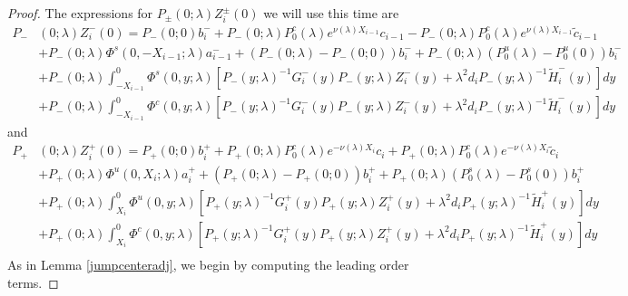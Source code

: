 \documentclass[thesis.tex]{subfiles}
\begin{document}
\begin{lemma}
\begin{proof}
The expressions for $P_\pm(0; \lambda) Z_i^\pm(0)$ we will use this time are
\begin{align*}
P_-&(0; \lambda) Z_i^-(0) = P_-(0; 0) b_i^- + P_-(0; \lambda)P_0^c(\lambda) e^{\nu(\lambda) X_{i-1}} c_{i-1} - P_-(0; \lambda)P_0^c(\lambda) e^{\nu(\lambda) X_{i-1}} \tilde{c}_{i-1} \\
&+ P_-(0; \lambda) \Phi^s(0, -X_{i-1}; \lambda) a_{i-1}^- + (P_-(0; \lambda) - P_-(0; 0))b_i^- + P_-(0; \lambda)(P_0^u(\lambda) - P_0^u(0))b_i^- \\
&+ P_-(0; \lambda) \int_{-X_{i-1}}^0 \Phi^s(0, y; \lambda) [P_-(y; \lambda)^{-1} G_i^-(y) P_-(y; \lambda)Z_i^-(y) + \lambda^2 d_i P_-(y; \lambda)^{-1} \tilde{H}_i^-(y)] dy \\
&+ P_-(0; \lambda) \int_{-X_{i-1}}^0 \Phi^c(0, y; \lambda) [P_-(y; \lambda)^{-1} G_i^-(y) P_-(y; \lambda)Z_i^-(y) + \lambda^2 d_i P_-(y; \lambda)^{-1} \tilde{H}_i^-(y)] dy
\end{align*}
and
\begin{align*}
P_+&(0; \lambda) Z_i^+(0) = P_+(0; 0) b_i^+ + P_+(0; \lambda) P_0^c(\lambda) e^{-\nu(\lambda)X_i} c_i + P_+(0; \lambda) P_0^c(\lambda) e^{-\nu(\lambda)X_i} \tilde{c}_i \\
&+ P_+(0; \lambda) \Phi^u(0, X_i; \lambda) a_i^+ + (P_+(0; \lambda) - P_+(0; 0)) b_i^+ + P_+(0; \lambda) (P_0^s(\lambda) - P_0^s(0)) b_i^+ \\
&+ P_+(0; \lambda) \int_{X_i}^0 \Phi^u(0, y; \lambda) [P_+(y; \lambda)^{-1} G_i^+(y) P_+(y; \lambda) Z_i^+(y) + \lambda^2 d_i P_+(y; \lambda)^{-1} \tilde{H}_i^+(y)] dy \\
&+ P_+(0; \lambda) \int_{X_i}^0 \Phi^c(0, y; \lambda) [P_+(y; \lambda)^{-1} G_i^+(y) P_+(y; \lambda) Z_i^+(y) + \lambda^2 d_i P_+(y; \lambda)^{-1} \tilde{H}_i^+(y)] dy \\
\end{align*}
As in Lemma \ref{jumpcenteradj}, we begin by computing the leading order terms.


\end{proof}
\end{lemma}
\end{document}
